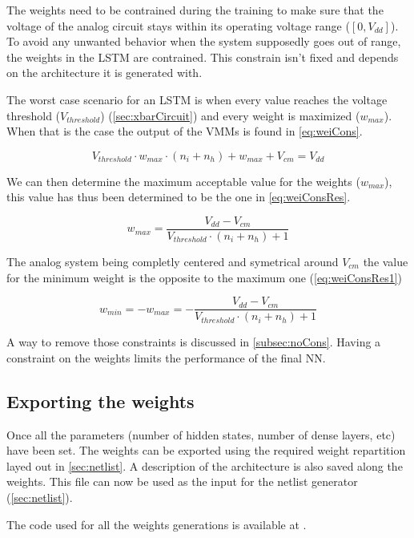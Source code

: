 The weights need to be contrained during the training to make sure that the voltage of the analog circuit stays within its operating voltage range ($[0,V_{dd}]$). To avoid any unwanted behavior when the system supposedly goes out of range, the weights in the \ac{LSTM} are contrained. This constrain isn't fixed and depends on the architecture it is generated with.

The worst case scenario for an \ac{LSTM} is when every value reaches the voltage threshold ($V_{threshold}$) (\cref{sec:xbarCircuit}) and every weight is maximized ($w_{max}$). When that is the case the output of the \acp{VMM} is found in \cref{eq:weiCons}.

\begin{equation}\label{eq:weiCons}
  V_{threshold}\cdot w_{max} \cdot(n_i+n_h)+w_{max}+V_{cm}= V_{dd}
\end{equation}

We can then determine the maximum acceptable value for the weights ($w_{max}$), this value has thus been determined to be the one in \cref{eq:weiConsRes}.

\begin{equation}\label{eq:weiConsRes}
  w_{max}=\frac{V_{dd}-V_{cm}}{V_{threshold}\cdot(n_i+n_h)+1}
\end{equation}

The analog system being completly centered and symetrical around $V_{cm}$ the value for the minimum weight is the opposite to the maximum one (\cref{eq:weiConsRes1})

\begin{equation}\label{eq:weiConsRes1}
  w_{min}=-w_{max}=-\frac{V_{dd}-V_{cm}}{V_{threshold}\cdot(n_i+n_h)+1}
\end{equation}

A way to remove those constraints is discussed in \cref{subsec:noCons}. Having a constraint on the weights limits the performance of the final \ac{NN}.

\subsection{Exporting the weights}

Once all the parameters (number of hidden states, number of dense layers, etc) have been set. The weights can be exported using the required weight repartition layed out in \cref{sec:netlist}. A description of the architecture is also saved along the weights. This file can now be used as the input for the netlist generator (\cref{sec:netlist}).

The code used for all the weights generations is available at \cite{lstmWei}. %
